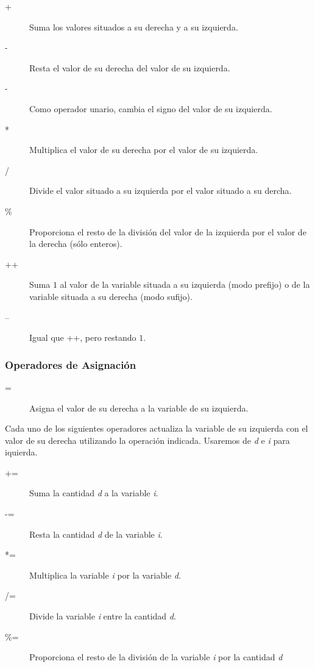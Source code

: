 \begin{description}
\item [+] Suma los valores situados a su derecha y a su izquierda.
\item [-] Resta el valor de su derecha del valor de su izquierda.
\item [-] Como operador unario, cambia el signo del valor  de su izquierda.
\item [*] Multiplica el valor de su derecha por el valor de su izquierda.
\item [/] Divide el valor situado a su izquierda por el valor situado a su dercha.
\item [\%] Proporciona el resto de la división del valor de la izquierda por el valor de la derecha (sólo enteros).
\item [++] Suma $1$ al valor de la variable situada a su izquierda (modo prefijo) o de la variable situada a su derecha (modo sufijo).
\item [--] Igual que ++, pero restando $1$. 
\end{description}

\subsubsection{Operadores de Asignación}

\begin{description}
\item [=] Asigna el valor de su derecha a la variable de su izquierda.
\end{description}

Cada uno de los siguientes operadores actualiza la variable de su izquierda con el valor de su derecha utilizando la operación indicada. Usaremos de \textit{d} e \textit{i} para iquierda.

\begin{description}
\item [+=] Suma la cantidad \textit{d} a la variable \textit{i}.
\item [-=] Resta la cantidad \textit{d} de la variable \textit{i}.
\item [*=] Multiplica la variable \textit{i} por la variable \textit{d}.
\item [/=] Divide la variable \textit{i} entre la cantidad \textit{d}.
\item [\%=] Proporciona el resto de la división de la variable \textit{i}  por la cantidad \textit{d}
\end{description}

